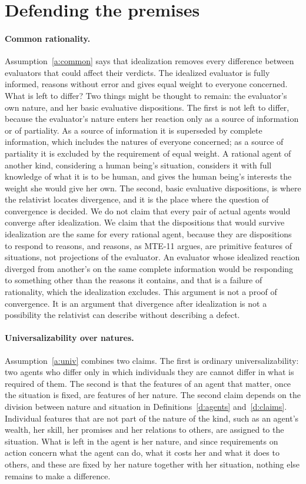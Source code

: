 \documentclass{situationist-preprint}
\begin{document}
\section{Defending the premises}\label{s:premises}

\paragraph{Common rationality.} Assumption~\ref{a:common} says that idealization removes every difference between evaluators that could affect their verdicts. The idealized evaluator is fully informed, reasons without error and gives equal weight to everyone concerned. What is left to differ? Two things might be thought to remain: the evaluator's own nature, and her basic evaluative dispositions. The first is not left to differ, because the evaluator's nature enters her reaction only as a source of information or of partiality. As a source of information it is superseded by complete information, which includes the natures of everyone concerned; as a source of partiality it is excluded by the requirement of equal weight. A rational agent of another kind, considering a human being's situation, considers it with full knowledge of what it is to be human, and gives the human being's interests the weight she would give her own. The second, basic evaluative dispositions, is where the relativist locates divergence, and it is the place where the question of convergence is decided. We do not claim that every pair of actual agents would converge after idealization. We claim that the dispositions that would survive idealization are the same for every rational agent, because they are dispositions to respond to reasons, and reasons, as MTE-11 argues, are primitive features of situations, not projections of the evaluator. An evaluator whose idealized reaction diverged from another's on the same complete information would be responding to something other than the reasons it contains, and that is a failure of rationality, which the idealization excludes. This argument is not a proof of convergence. It is an argument that divergence after idealization is not a possibility the relativist can describe without describing a defect.

\paragraph{Universalizability over natures.} Assumption~\ref{a:univ} combines two claims. The first is ordinary universalizability: two agents who differ only in which individuals they are cannot differ in what is required of them. The second is that the features of an agent that matter, once the situation is fixed, are features of her nature. The second claim depends on the division between nature and situation in Definitions~\ref{d:agents} and~\ref{d:claims}. Individual features that are not part of the nature of the kind, such as an agent's wealth, her skill, her promises and her relations to others, are assigned to the situation. What is left in the agent is her nature, and since requirements on action concern what the agent can do, what it costs her and what it does to others, and these are fixed by her nature together with her situation, nothing else remains to make a difference.
\end{document}

